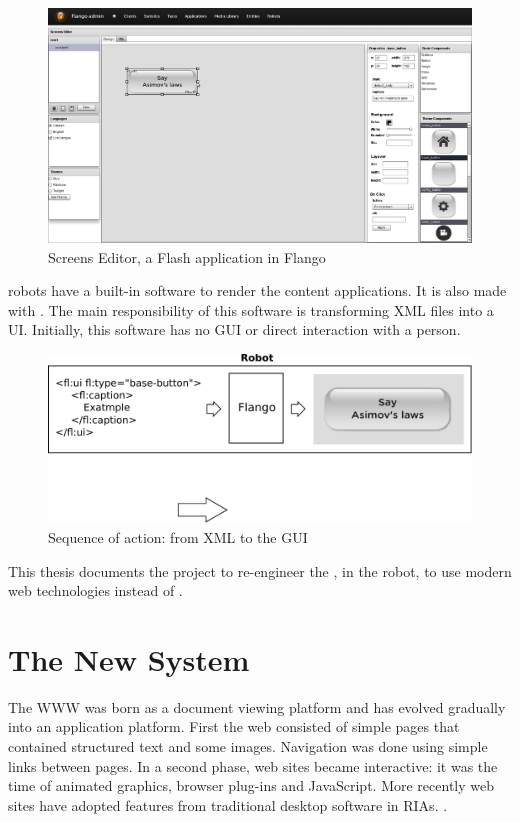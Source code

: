 \begin{figure}[htb]
    \label{fig:screens-editor}
    \centering
    \includegraphics[width=\textwidth]{figures/screens-editor}
    \caption{Screens Editor, a Flash application in Flango}
\end{figure}

\reem{} robots have a built-in software to render the content applications. 
It is also made with \flash .
The main responsibility of this software is transforming \ac{XML} files into a \ac{UI}. 
Initially, this software has no \ac{GUI} or direct interaction with a person.

\begin{figure}[htb]
    \label{fig:xml-flango-view}
    \centering
    \includegraphics[width=\textwidth]{figures/xml-flango-screenshot}
    \caption{Sequence of action: from \ac{XML} to the \ac{GUI}}
\end{figure}

This thesis documents the project to re-engineer the \cm , in the robot, to use modern web technologies instead of \flash.

\section{The New System}
The \ac{WWW} was born as a document viewing platform and has evolved gradually into an application platform. 
First the web consisted of simple pages that contained structured text and some images. 
Navigation was done using simple links between pages. 
In a second phase, web sites became interactive: 
it was the time of animated graphics, browser plug-ins and JavaScript. 
More recently web sites have adopted features from traditional desktop software in \acp{RIA}. \cite{Anttonen:2011}.

